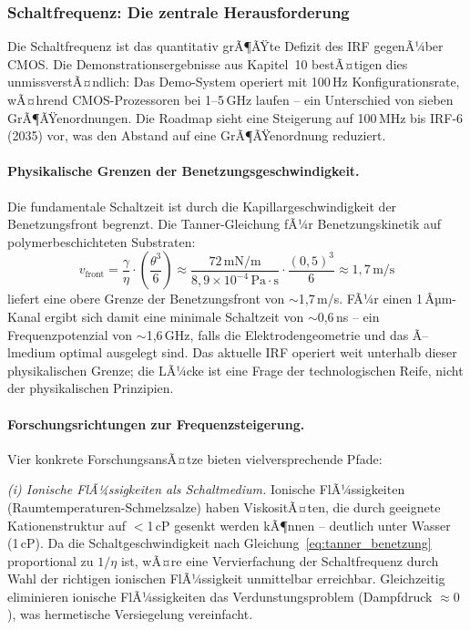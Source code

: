﻿\documentclass[a4paper,12pt]{scrreprt}
\theoremstyle{definition}
\begin{document}
\subsubsection{Schaltfrequenz: Die zentrale Herausforderung}
\label{subsubsec:frequenz}

Die Schaltfrequenz ist das quantitativ grÃ¶ÃŸte Defizit des IRF gegenÃ¼ber
CMOS. Die Demonstrationsergebnisse aus Kapitel~10 bestÃ¤tigen dies
unmissverstÃ¤ndlich: Das Demo-System operiert mit 100\,Hz Konfigurationsrate,
wÃ¤hrend CMOS-Prozessoren bei 1--5\,GHz laufen -- ein Unterschied von
sieben GrÃ¶ÃŸenordnungen. Die Roadmap sieht eine Steigerung auf 100\,MHz
bis IRF-6 (2035) vor, was den Abstand auf eine GrÃ¶ÃŸenordnung reduziert.

\paragraph{Physikalische Grenzen der Benetzungsgeschwindigkeit.}
Die fundamentale Schaltzeit ist durch die Kapillargeschwindigkeit
der Benetzungsfront begrenzt. Die Tanner-Gleichung fÃ¼r
Benetzungskinetik auf polymerbeschichteten Substraten:
\begin{equation}
	v_\text{front} = \frac{\gamma}{\eta} \cdot \left(\frac{\theta^3}{6}\right)
	\approx \frac{72\,\text{mN/m}}{8{,}9 \times 10^{-4}\,\text{Pa}\cdot\text{s}}
	\cdot \frac{(0{,}5)^3}{6}
	\approx 1{,}7\,\text{m/s}
	\label{eq:tanner_benetzung}
\end{equation}
liefert eine obere Grenze der Benetzungsfront von $\sim$1,7\,m/s.
FÃ¼r einen 1\,Âµm-Kanal ergibt sich damit eine minimale Schaltzeit von
$\sim$0,6\,ns -- ein Frequenzpotenzial von $\sim$1,6\,GHz, falls
die Elektrodengeometrie und das Ã–lmedium optimal ausgelegt sind.
Das aktuelle IRF operiert weit unterhalb dieser physikalischen Grenze;
die LÃ¼cke ist eine Frage der technologischen Reife, nicht der
physikalischen Prinzipien.

\paragraph{Forschungsrichtungen zur Frequenzsteigerung.}
Vier konkrete ForschungsansÃ¤tze bieten vielversprechende Pfade:

\textit{(i) Ionische FlÃ¼ssigkeiten als Schaltmedium.} Ionische FlÃ¼ssigkeiten
(Raumtemperaturen-Schmelzsalze) haben ViskositÃ¤ten, die durch geeignete
Kationenstruktur auf $<$1\,cP gesenkt werden kÃ¶nnen -- deutlich unter Wasser
(1\,cP). Da die Schaltgeschwindigkeit nach Gleichung~\eqref{eq:tanner_benetzung}
proportional zu $1/\eta$ ist, wÃ¤re eine Vervierfachung der Schaltfrequenz
durch Wahl der richtigen ionischen FlÃ¼ssigkeit unmittelbar erreichbar.
Gleichzeitig eliminieren ionische FlÃ¼ssigkeiten das Verdunstungsproblem
(Dampfdruck $\approx 0$), was hermetische Versiegelung vereinfacht.
\end{document}
